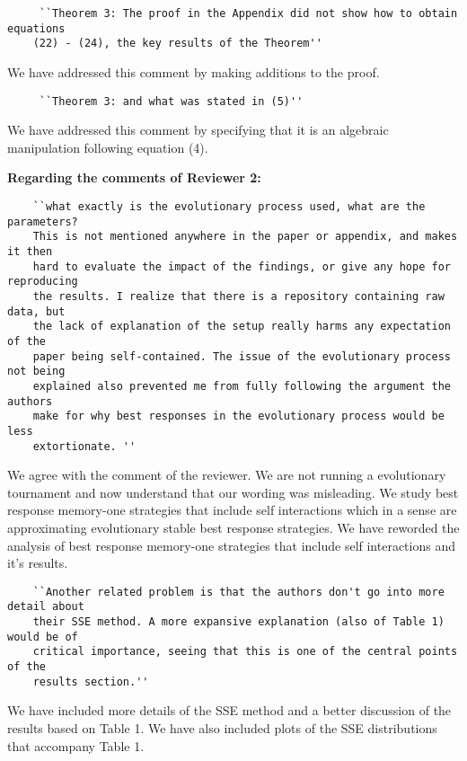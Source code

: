 \documentclass{article}
\begin{document}
\begin{verbatim}
     ``Theorem 3: The proof in the Appendix did not show how to obtain equations
    (22) - (24), the key results of the Theorem''
\end{verbatim}

We have addressed this comment by making additions to the proof.

\begin{verbatim}
     ``Theorem 3: and what was stated in (5)''
\end{verbatim}

We have addressed this comment by specifying that it is an algebraic manipulation
following equation (4).

\textbf{Regarding the comments of Reviewer 2:}

\begin{verbatim}
    ``what exactly is the evolutionary process used, what are the parameters?
    This is not mentioned anywhere in the paper or appendix, and makes it then
    hard to evaluate the impact of the findings, or give any hope for reproducing
    the results. I realize that there is a repository containing raw data, but
    the lack of explanation of the setup really harms any expectation of the
    paper being self-contained. The issue of the evolutionary process not being
    explained also prevented me from fully following the argument the authors
    make for why best responses in the evolutionary process would be less
    extortionate. ''
\end{verbatim}

We agree with the comment of the reviewer. We are not running a evolutionary %
tournament and now understand that our wording was misleading. We study best
response memory-one strategies that include self interactions which in a sense are
approximating evolutionary stable best response strategies. We have reworded
the analysis of best response memory-one strategies that include self interactions
and it's results.

\begin{verbatim}
    ``Another related problem is that the authors don't go into more detail about
    their SSE method. A more expansive explanation (also of Table 1) would be of
    critical importance, seeing that this is one of the central points of the
    results section.''
\end{verbatim}

We have included more details of the SSE method and a better
discussion of the results based on Table 1. We have also included plots of the
SSE distributions that accompany Table 1.
\end{document}
